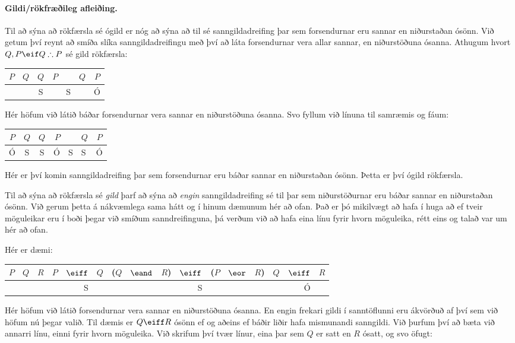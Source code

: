 \paragraph{Gildi/rökfræðileg afleiðing.}
 
Til að sýna að rökfærsla sé ógild er nóg að sýna að til sé sanngildadreifing þar sem forsendurnar eru sannar en niðurstaðan ósönn. Við getum því reynt að smíða slíka sanngildadreifingu með því að láta forsendurnar vera allar sannar, en niðurstöðuna ósanna. Athugum hvort $Q, P \eif Q \therefore P$ sé gild rökfærsla:

\begin{center}
	\begin{tabular}{c c|c| d e f | c}
		$P$&$Q$&$Q$&$P$&\eif&$Q$&$P$\\
		\hline
		 & & S & &S & & Ó
	\end{tabular}
\end{center}
Hér höfum við látið báðar forsendurnar vera sannar en niðurstöðuna ósanna. Svo fyllum við línuna til samræmis og fáum:

\begin{center}
	\begin{tabular}{c c|c| d e f | c}
		$P$&$Q$&$Q$&$P$&\eif&$Q$&$P$\\
		\hline
		 Ó & S & S & Ó & S & S & Ó
	\end{tabular}
\end{center}
Hér er því komin sanngildadreifing þar sem forsendurnar eru báðar sannar en niðurstaðan ósönn. Þetta er því ógild rökfærsla.

Til að sýna að rökfærsla sé \emph{gild} þarf að sýna að \emph{engin} sanngildadreifing sé til þar sem niðurstöðurnar eru báðar sannar en niðurstaðan ósönn. Við gerum þetta á nákvæmlega sama hátt og í hinum dæmunum hér að ofan. Það er þó mikilvægt að hafa í huga að ef tveir möguleikar eru í boði þegar við smíðum sanndreifinguna, þá verðum við að hafa eina línu fyrir hvorn möguleika, rétt eins og talað var um hér að ofan.

Hér er dæmi:

\begin{center}
	\begin{tabular}{c c c | d d f | d d d d d d f | d d f}
		$P$&$Q$&$R$&$P$&$\eiff$&$Q$&($Q$&$\eand$&$R$)&$\eiff$&($P$&$\eor$&$R$)&$Q$&$\eiff$&$R$ \\
		\hline
		 & & & & S & & & & & S & & & & & Ó &
	\end{tabular}
\end{center}
Hér höfum við látið forsendurnar vera sannar en niðurstöðuna ósanna. En engin frekari gildi í sanntöflunni eru ákvörðuð af því sem við höfum nú þegar valið. Til dæmis er $Q \eiff R$ ósönn ef og aðeins ef báðir liðir hafa mismunandi sanngildi. Við þurfum því að bæta við annarri línu, einni fyrir hvorn möguleika. Við skrifum því tvær línur, eina þar sem $Q$ er satt en $R$ ósatt, og svo öfugt:

